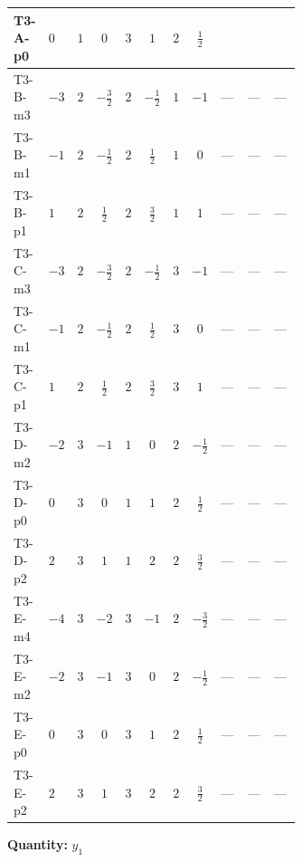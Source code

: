 \documentclass[8pt]{article}
\begin{document}
\begin{landscape}
\begin{longtable}{@{}llcccccc >{\raggedright\arraybackslash}p{0.21\linewidth} >{\raggedright\arraybackslash}p{0.21\linewidth} >{\raggedright\arraybackslash}p{0.21\linewidth}@{}}
\midrule
T3-A-p0 & $0$ & $1$ & $0$ & $3$ & $1$ & $2$ & $\frac{1}{2}$ & \scriptsize\adjustbox{max width=\linewidth}{$\begin{gathered} 2 T_{\nu}^{(1)} \left({y_1}\right)_{ij}\end{gathered}$} & \scriptsize\adjustbox{max width=\linewidth}{$\begin{gathered} +\frac{3}{4} \left({y_2}\,\left({y_2}\right)^{\dagger}\,{y_1}\right)_{ij}\end{gathered}$} & \scriptsize\adjustbox{max width=\linewidth}{$\begin{gathered} +\frac{1}{2} \left({Y_e}\,\left({Y_e}\right)^{\dagger}\,{y_1}\right)_{ij}\end{gathered}$} \\
\midrule
T3-B-m3 & $-3$ & $2$ & $-\frac{3}{2}$ & $2$ & $-\frac{1}{2}$ & $1$ & $-1$ & --- & --- & --- \\
\midrule
T3-B-m1 & $-1$ & $2$ & $-\frac{1}{2}$ & $2$ & $\frac{1}{2}$ & $1$ & $0$ & --- & --- & --- \\
\midrule
T3-B-p1 & $1$ & $2$ & $\frac{1}{2}$ & $2$ & $\frac{3}{2}$ & $1$ & $1$ & --- & --- & --- \\
\midrule
T3-C-m3 & $-3$ & $2$ & $-\frac{3}{2}$ & $2$ & $-\frac{1}{2}$ & $3$ & $-1$ & --- & --- & --- \\
\midrule
T3-C-m1 & $-1$ & $2$ & $-\frac{1}{2}$ & $2$ & $\frac{1}{2}$ & $3$ & $0$ & --- & --- & --- \\
\midrule
T3-C-p1 & $1$ & $2$ & $\frac{1}{2}$ & $2$ & $\frac{3}{2}$ & $3$ & $1$ & --- & --- & --- \\
\midrule
T3-D-m2 & $-2$ & $3$ & $-1$ & $1$ & $0$ & $2$ & $-\frac{1}{2}$ & --- & --- & --- \\
\midrule
T3-D-p0 & $0$ & $3$ & $0$ & $1$ & $1$ & $2$ & $\frac{1}{2}$ & --- & --- & --- \\
\midrule
T3-D-p2 & $2$ & $3$ & $1$ & $1$ & $2$ & $2$ & $\frac{3}{2}$ & --- & --- & --- \\
\midrule
T3-E-m4 & $-4$ & $3$ & $-2$ & $3$ & $-1$ & $2$ & $-\frac{3}{2}$ & --- & --- & --- \\
\midrule
T3-E-m2 & $-2$ & $3$ & $-1$ & $3$ & $0$ & $2$ & $-\frac{1}{2}$ & --- & --- & --- \\
\midrule
T3-E-p0 & $0$ & $3$ & $0$ & $3$ & $1$ & $2$ & $\frac{1}{2}$ & --- & --- & --- \\
\midrule
T3-E-p2 & $2$ & $3$ & $1$ & $3$ & $2$ & $2$ & $\frac{3}{2}$ & --- & --- & --- \\
\midrule
\bottomrule
\end{longtable}
\clearpage
\noindent\textbf{Quantity: }$y_1$\par\smallskip

\end{landscape}
\end{document}
